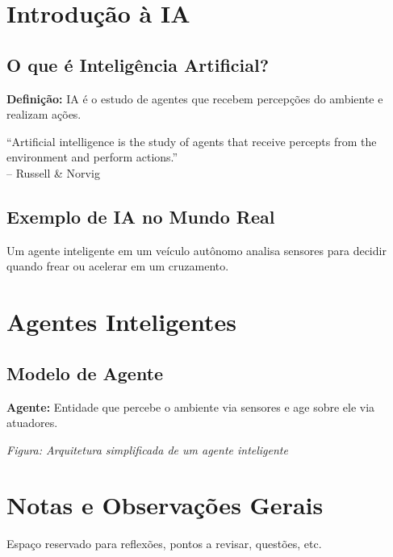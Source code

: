 \section{Introdução à IA}

\subsection{O que é Inteligência Artificial?}
\begin{conceptbox}
\textbf{Definição:} IA é o estudo de agentes que recebem percepções do ambiente e realizam ações.
\end{conceptbox}

\begin{quotebox}
“Artificial intelligence is the study of agents that receive percepts from the environment and perform actions.”\\
\hfill -- Russell \& Norvig
\end{quotebox}

\subsection{Exemplo de IA no Mundo Real}
\begin{examplebox}
Um agente inteligente em um veículo autônomo analisa sensores para decidir quando frear ou acelerar em um cruzamento.
\end{examplebox}

\section{Agentes Inteligentes}

\subsection{Modelo de Agente}
\begin{conceptbox}
\textbf{Agente:} Entidade que percebe o ambiente via sensores e age sobre ele via atuadores.
\end{conceptbox}

\begin{diagrambox}
\textit{Figura: Arquitetura simplificada de um agente inteligente}
\end{diagrambox}

\section{Notas e Observações Gerais}
Espaço reservado para reflexões, pontos a revisar, questões, etc.
